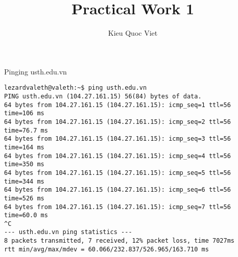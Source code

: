 \documentclass{report}
\title{Practical Work 1}
\author{Kieu Quoc Viet}
\begin{document}
\maketitle


\begin{section}{Pinging usth.edu.vn}
\begin{verbatim}
lezardvaleth@valeth:~$ ping usth.edu.vn
PING usth.edu.vn (104.27.161.15) 56(84) bytes of data.
64 bytes from 104.27.161.15 (104.27.161.15): icmp_seq=1 ttl=56 time=106 ms
64 bytes from 104.27.161.15 (104.27.161.15): icmp_seq=2 ttl=56 time=76.7 ms
64 bytes from 104.27.161.15 (104.27.161.15): icmp_seq=3 ttl=56 time=164 ms
64 bytes from 104.27.161.15 (104.27.161.15): icmp_seq=4 ttl=56 time=350 ms
64 bytes from 104.27.161.15 (104.27.161.15): icmp_seq=5 ttl=56 time=344 ms
64 bytes from 104.27.161.15 (104.27.161.15): icmp_seq=6 ttl=56 time=526 ms
64 bytes from 104.27.161.15 (104.27.161.15): icmp_seq=7 ttl=56 time=60.0 ms
^C
--- usth.edu.vn ping statistics ---
8 packets transmitted, 7 received, 12% packet loss, time 7027ms
rtt min/avg/max/mdev = 60.066/232.837/526.965/163.710 ms
    
\end{verbatim}
\end{section}
\end{document}
